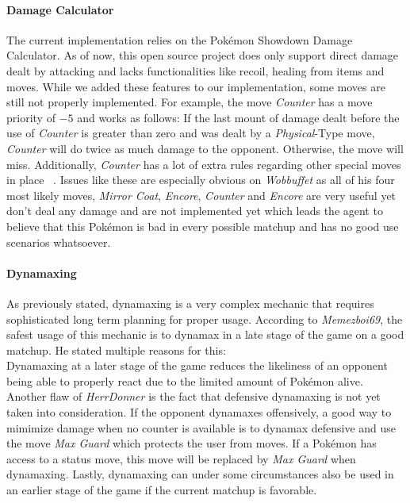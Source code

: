 \paragraph{Damage Calculator}
The current implementation relies on the Pokémon Showdown Damage Calculator. As of now, this open source project does 
only support direct damage dealt by attacking and lacks functionalities like recoil, healing from items and moves. While
we added these features to our implementation, some moves are still not properly implemented. For example, the move
\textit{Counter} has a move priority  of $-5$ and works as follows:
If the last mount of damage dealt before the use of \textit{Counter} is greater than zero and was dealt by a 
\textit{Physical}-Type move, \textit{Counter} will do twice as much damage to the opponent. Otherwise, the move
will miss. Additionally, \textit{Counter} has a lot of extra rules regarding other special moves in place 
~\autocite{Bulbapedia:Counter}. Issues like these are especially obvious on \textit{Wobbuffet} as all of his four
most likely moves, \textit{Mirror Coat}, \textit{Encore}, \textit{Counter} and \textit{Encore} are very useful
yet don't deal any damage and are not implemented yet which leads the agent to believe that this Pokémon is bad 
in every possible matchup and has no good use scenarios whatsoever.

\paragraph{Dynamaxing}
\label{par:eval-dynamx}
As previously stated, dynamaxing is a very complex mechanic that requires sophisticated long term planning for
proper usage. According to \textit{Memezboi69}, the safest usage of this mechanic is to dynamax in a late stage
of the game on a good matchup. He stated multiple reasons for this: \\
Dynamaxing at a later stage of the game reduces the likeliness of an opponent being able to properly react due to the 
limited amount of Pokémon alive. \\
Another flaw of \textit{HerrDonner} is the fact that defensive dynamaxing is not yet taken into consideration. 
If the opponent dynamaxes offensively, a good way to mimimize damage when no counter is available is to dynamax
defensive and use the move \textit{Max Guard} which protects the user from moves. If a Pokémon has access to 
a status move, this move will be replaced by \textit{Max Guard} when dynamaxing. Lastly, dynamaxing can under 
some circumstances also be used in an earlier stage of the game if the current matchup is favorable. 

